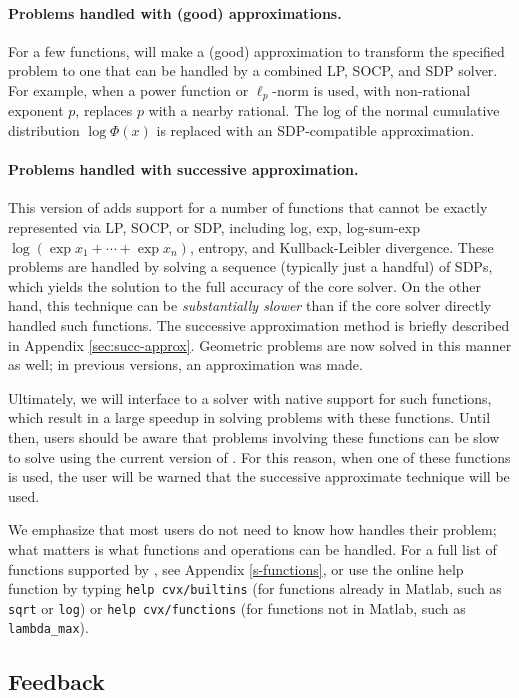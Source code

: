 \documentclass[12pt]{article}
\begin{document}
\paragraph{Problems handled with (good) approximations.}
For a few functions, \cvx will make a (good) approximation to transform the
specified problem to one that can be handled by a combined 
LP, SOCP, and SDP solver.
For example, when a power function or $\ell_p$-norm is used, with 
non-rational exponent $p$, \cvx replaces $p$ with a nearby rational.
The log of the normal cumulative distribution $\log \Phi(x)$ is
replaced with an SDP-compatible approximation.

\paragraph{Problems handled with successive approximation.}
This version of \cvx adds support for a number of functions that cannot
be exactly represented via LP, SOCP, or SDP, including 
log, exp, log-sum-exp $\log (\exp x_1+ \cdots + \exp x_n)$,
entropy, and Kullback-Leibler divergence.
These problems are handled by solving a sequence (typically just a handful)
of SDPs, which yields the solution to the full accuracy of the core solver.
On the other hand, this technique can be 
\emph{substantially slower}
than if the core solver directly handled such functions.
The successive approximation method is briefly described in
Appendix \ref{sec:succ-approx}. Geometric problems are now solved in
this manner as well; in previous versions, an approximation was made.

Ultimately, we will interface \cvx to a solver with native support for 
such functions, which result in a large speedup in solving problems
with these functions.
Until then, users should be aware that problems involving these functions
can be slow to solve using the current version of \cvx.
For this reason, when one of these functions is used, the user will be 
warned that the successive approximate technique will be used.

We emphasize that most users do not need 
to know how \cvx handles their problem; what matters is what functions
and operations can be handled.
For a full list of functions supported by \cvx, 
see Appendix \ref{s-functions}, or use the online help function by typing
\verb+help cvx/builtins+ 
(for functions already in Matlab, such as \verb+sqrt+ or \verb+log+)
or \verb+help cvx/functions+
(for functions not in Matlab, such as \verb+lambda_max+).

\subsection{Feedback}
\label{sec:feedback}
\end{document}

